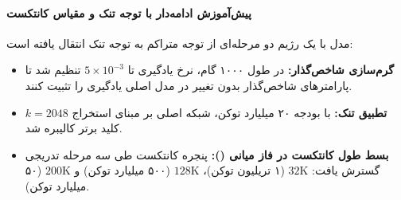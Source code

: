 \paragraph*{پیش‌آموزش ادامه‌دار با توجه تنک و مقیاس کانتکست}
مدل با یک رژیم دو مرحله‌ای از توجه متراکم به توجه تنک انتقال یافته است:
\begin{itemize}
    \item \textbf{گرم‌سازی شاخص‌گذار:} در طول ۱۰۰۰ گام، نرخ یادگیری تا $5 \times 10^{-3}$ تنظیم شد تا پارامترهای شاخص‌گذار بدون تغییر در مدل اصلی یادگیری را تثبیت کنند.
    \item \textbf{تطبیق تنک:} با بودجه ۲۰ میلیارد توکن، شبکه اصلی بر مبنای استخراج $k=2048$ کلید برتر کالیبره شد.
    \item \textbf{بسط طول کانتکست در فاز میانی ():} پنجره کانتکست طی سه مرحله تدریجی گسترش یافت: $32\text{K}$ (۱ تریلیون توکن)، $128\text{K}$ (۵۰۰ میلیارد توکن) و $200\text{K}$ (۵۰ میلیارد توکن).
\end{itemize}